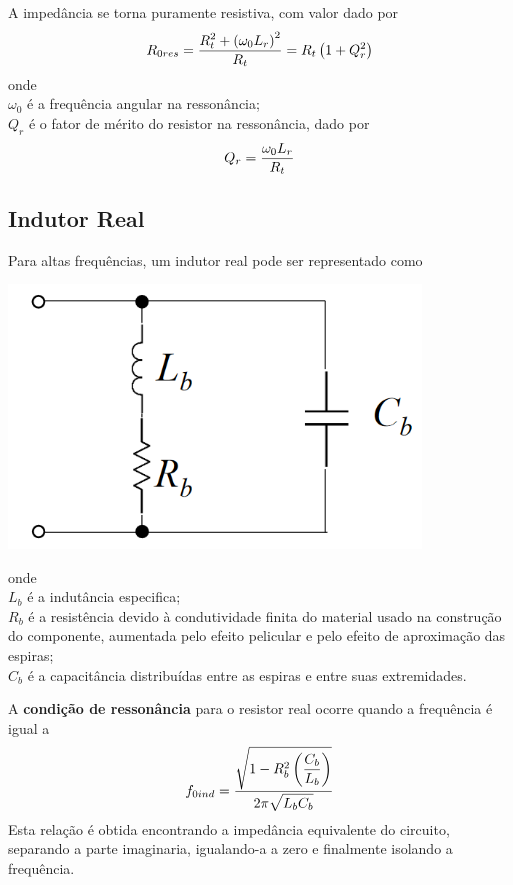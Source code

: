 A impedância se torna puramente resistiva, com valor dado por
\begin{equation}
R_{0res}=\displaystyle \frac{\displaystyle R_t^2+\left(\omega_0L_r\right)^2 }{ \displaystyle R_t}=R_t\left(1+Q_r^2\right)
\end{equation}
onde\\
$\omega_0$ é a frequência angular na ressonância;\\
$Q_r$ é o fator de mérito do resistor na ressonância, dado por
\begin{equation}
Q_r=\displaystyle \frac{\displaystyle \omega_0L_r }{ \displaystyle R_t}
\end{equation}


\subsection{Indutor Real}

Para altas frequências, um indutor real pode ser representado como
\begin{center}
	\includegraphics[height=7cm]{week01_ResumoIndutorReal.png}
\end{center}
onde \\
$L_b$ é a indutância especifica;\\
$R_b$ é a resistência devido à condutividade finita do material usado na construção do componente, aumentada pelo efeito pelicular e pelo efeito de aproximação das espiras;\\
$C_b$ é a capacitância distribuídas entre as espiras e entre suas extremidades.


A \textbf{condição de ressonância} para o resistor real ocorre quando a frequência é igual a
\begin{equation}
f_{0ind}=\displaystyle \frac{\displaystyle \sqrt{1-R_b^2\left(\displaystyle \frac{\displaystyle C_b }{ \displaystyle L_b}\right)} }{ \displaystyle 2\pi\sqrt{L_bC_b}}
\end{equation}
Esta relação é obtida encontrando a impedância equivalente do circuito, separando a parte imaginaria, igualando-a a zero e finalmente isolando a frequência.


